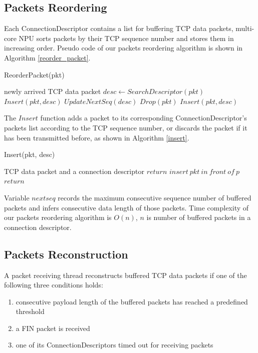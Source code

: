 \documentclass[conference]{IEEEtran}
\begin{document}
\subsection{Packets Reordering}
Each ConnectionDescriptor contains a list for buffering TCP data packets, multi-core NPU sorts packets by their TCP sequence number and stores them in increasing order. Pseudo code of our packets reordering algorithm is shown in Algorithm \ref{reorder_packet}.
\begin{algorithm}
\caption{ReorderPacket(pkt)}
\label{reorder_packet}
\begin{algorithmic}
\REQUIRE newly arrived TCP data packet
\STATE $desc \leftarrow SearchDescriptor(pkt)$
\STATE $Insert(pkt, desc)$
\STATE $UpdateNextSeq(desc)$
\ELSE {}
    \STATE $Drop(pkt)$
    \ELSE \STATE $Insert(pkt, desc)$
    \ENDIF
\ENDIF
\end{algorithmic}
\end{algorithm}
The $Insert$ function adds a packet to its corresponding ConnectionDescriptor's packets list according to the TCP sequence number, or discards the packet if it has been transmitted before, as shown in Algorithm \ref{insert}.
\begin{algorithm}
\caption{Insert(pkt, desc)}
\label{insert}
\begin{algorithmic}
\REQUIRE TCP data packet and a connection descriptor
\STATE $return$
\ELSE {}
    \STATE $insert\ pkt\ in\ front\ of\ p$
    \STATE $return$
    \ENDIF
\ENDIF
\ENDFOR
\end{algorithmic}
\end{algorithm}
Variable $nextseq$ records the maximum consecutive sequence number of buffered packets and infers consecutive data length of those packets. Time complexity of our packets reordering algorithm is $O(n)$, $n$ is number of buffered packets in a connection descriptor.
\subsection{Packets Reconstruction}
A packet receiving thread reconstructs buffered TCP data packets if one of the following three conditions holds:
\begin{enumerate}
\item consecutive payload length of the buffered packets has reached a predefined threshold
\item a FIN packet is received
\item one of its ConnectionDescriptors timed out for receiving packets
\end{enumerate}
\end{document}
